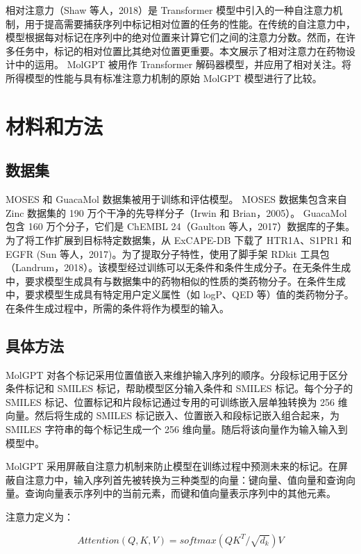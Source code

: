 相对注意力（Shaw 等人，2018）是 Transformer 模型中引入的一种自注意力机制，用于提高需要捕获序列中标记相对位置的任务的性能。在传统的自注意力中，模型根据每对标记在序列中的绝对位置来计算它们之间的注意力分数。然而，在许多任务中，标记的相对位置比其绝对位置更重要。本文展示了相对注意力在药物设计中的运用。 MolGPT 被用作 Transformer 解码器模型，并应用了相对关注。将所得模型的性能与具有标准注意力机制的原始 MolGPT 模型进行了比较。

\section{材料和方法}

\subsection{数据集}

MOSES 和 GuacaMol 数据集被用于训练和评估模型。 MOSES 数据集包含来自 Zinc 数据集的 190 万个干净的先导样分子（Irwin 和 Brian，2005）。 GuacaMol 包含 160 万个分子，它们是 ChEMBL 24（Gaulton 等人，2017）数据库的子集。为了将工作扩展到目标特定数据集，从 ExCAPE-DB 下载了 HTR1A、S1PR1 和 EGFR (Sun 等人，2017)。为了提取分子特性，使用了脚手架 RDkit 工具包（Landrum，2018）。该模型经过训练可以无条件和条件生成分子。在无条件生成中，要求模型生成具有与数据集中的药物相似的性质的类药物分子。在条件生成中，要求模型生成具有特定用户定义属性（如 logP、QED 等）值的类药物分子。在条件生成过程中，所需的条件将作为模型的输入。

\subsection{具体方法}

MolGPT 对各个标记采用位置值嵌入来维护输入序列的顺序。分段标记用于区分条件标记和 SMILES 标记，帮助模型区分输入条件和 SMILES 标记。每个分子的 SMILES 标记、位置标记和片段标记通过专用的可训练嵌入层单独转换为 256 维向量。然后将生成的 SMILES 标记嵌入、位置嵌入和段标记嵌入组合起来，为 SMILES 字符串的每个标记生成一个 256 维向量。随后将该向量作为输入输入到模型中。

MolGPT 采用屏蔽自注意力机制来防止模型在训练过程中预测未来的标记。在屏蔽自注意力中，输入序列首先被转换为三种类型的向量：键向量、值向量和查询向量。查询向量表示序列中的当前元素，而键和值向量表示序列中的其他元素。

注意力定义为：

\begin{equation}
  Attention(Q,K,V)=softmax({QK^T}/ {\sqrt{d_k}})V
\end{equation}

